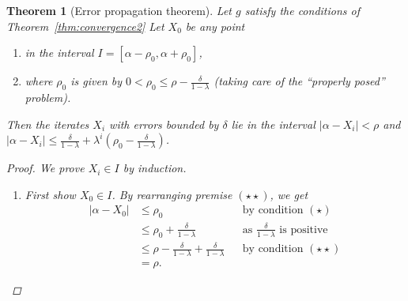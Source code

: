 \documentclass[12pt,letterpaper,DIV=11]{scrartcl}
\theoremstyle{plain}
\newtheorem{theorem}{Theorem}[section]
\theoremstyle{definition}
\theoremstyle{remark}
\begin{document}
\begin{theorem}[Error propagation theorem]
  Let $g$ satisfy the conditions of Theorem~\ref{thm:convergence2}
  Let $X_0$ be any point \begin{enumerate}
    \item[$(\star)$] in the interval $I = [\alpha - \rho_0, \alpha + \rho_0]$,
    \item[$(\star\star)$] where $\rho_0$ is given by $0 < \rho_0 \leq \rho - \frac{\delta}{1 - \lambda}$ (taking care of the \enquote{properly posed} problem).
  \end{enumerate}
  Then the iterates $X_i$ with errors bounded by $\delta$ lie in the interval $|\alpha - X_i| < \rho$ and $|\alpha - X_i| \leq \frac{\delta}{1 - \lambda} + \lambda^i \left( \rho_0 - \frac{\delta}{1 - \lambda} \right)$.

  \begin{proof}
    We prove $X_i \in I$ by induction.
    \begin{enumerate}
      \item First show $X_0 \in I$.
        By rearranging premise $(\star\star)$, we get \begin{align*}
          |\alpha - X_0| &\leq \rho_0 && \text{by condition $(\star)$} \\
                         &\leq \rho_0 + \frac{\delta}{1 - \lambda} && \text{as $\frac{\delta}{1 - \lambda}$ is positive} \\
                         &\leq \rho - \frac{\delta}{1 - \lambda} + \frac{\delta}{1 - \lambda} && \text{by condition $(\star\star)$} \\
                         &= \rho.
        \end{align*}


\end{enumerate}
\end{proof}
\end{theorem}
\end{document}
